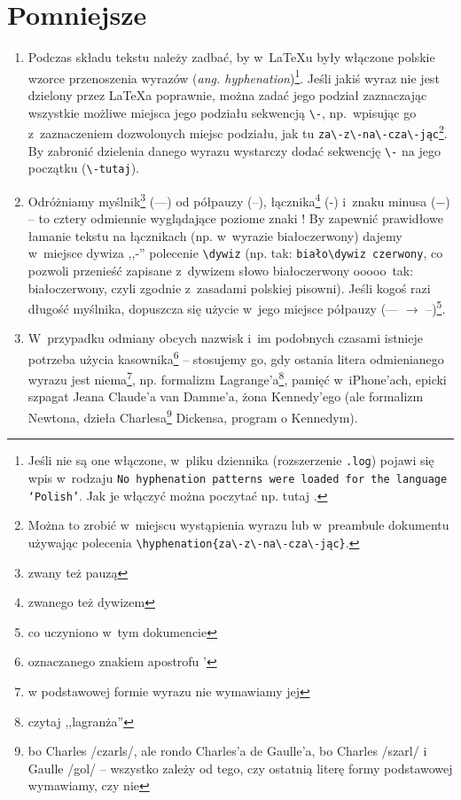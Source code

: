 \section{Pomniejsze}

\begin{enumerate}

\item Podczas składu tekstu należy zadbać, by w~\LaTeX{}u były włączone polskie wzorce przenoszenia wyrazów (\emph{ang. hyphenation})\footnote{Jeśli nie są one włączone, w~pliku dziennika (rozszerzenie \texttt{.log}) pojawi się wpis w~rodzaju \texttt{No hyphenation patterns were loaded for the language `Polish'}. Jak je włączyć można poczytać np. tutaj \cite{hyphen_on}.}. Jeśli jakiś wyraz nie jest dzielony przez \LaTeX{}a poprawnie, można zadać jego podział zaznaczając wszystkie możliwe miejsca jego podziału sekwencją \verb+\-+, np.\ wpisując go z~zaznaczeniem dozwolonych miejsc podziału, jak tu \verb+za\-z\-na\-cza\-jąc+\footnote{Można to zrobić w~miejscu wystąpienia wyrazu lub w~preambule dokumentu używając polecenia \texttt{\textbackslash hyphenation\{za\textbackslash-z\textbackslash-na\textbackslash-cza\textbackslash-jąc\}}.}.  By zabronić dzielenia danego wyrazu wystarczy dodać sekwencję \verb+\-+ na jego początku (\verb+\-tutaj+). 
  
\item Odróżniamy myślnik\footnote{zwany też pauzą} (---) od półpauzy (--), łącznika\footnote{zwanego też dywizem} (-) i~znaku minusa ($-$) -- to cztery odmiennie wyglądające poziome znaki \cite{myslniki_pwn,myslniki_wiki}! By zapewnić prawidłowe łamanie tekstu na łącznikach (np. w~wyrazie biało\dywiz czerwony) dajemy w~miejsce dywiza ,,-'' polecenie \verb|\dywiz| (np. tak: \verb|biało\dywiz czerwony|, co pozwoli przenieść zapisane z~dywizem słowo biało\dywiz czerwony ooooo~tak: biało\dywiz czerwony, czyli zgodnie z~zasadami polskiej pisowni). Jeśli kogoś razi długość myślnika, dopuszcza się użycie w~jego miejsce półpauzy (--- $\rightarrow$ --)\footnote{co uczyniono w~tym dokumencie}.

\item W~przypadku odmiany obcych nazwisk i~im podobnych czasami istnieje potrzeba użycia kasownika\footnote{oznaczanego znakiem apostrofu '} -- stosujemy go, gdy ostania litera odmienianego wyrazu jest niema\footnote{w podstawowej formie wyrazu nie wymawiamy jej}, np. formalizm Lagrange'a\footnote{czytaj ,,lagranża''}, pamięć w~iPhone'ach, epicki szpagat Jeana Claude’a van Damme’a, żona Kennedy’ego (ale formalizm Newtona, dzieła Charlesa\footnote{bo Charles /czarls/, ale rondo Charles’a de Gaulle’a, bo Charles /szarl/ i Gaulle /gol/ -- wszystko zależy od tego, czy ostatnią literę formy podstawowej wymawiamy, czy nie} Dickensa, program o Kennedym).
  

\end{enumerate}

